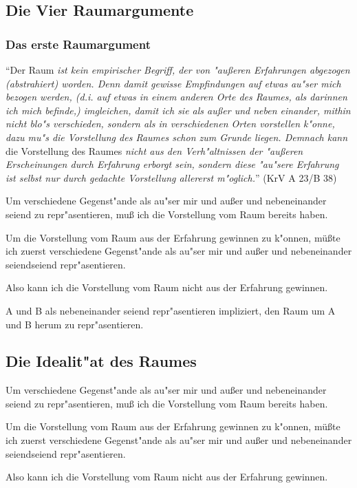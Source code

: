 \documentclass[emulatestandardclasses]{scrartcl}
\begin{document}
\subsection{Die Vier Raumargumente}

\subsubsection{Das erste Raumargument}

"`Der Raum \emph{ist kein empirischer Begriff, der von "außeren Erfahrungen abgezogen (abstrahiert) worden. Denn damit gewisse Empfindungen auf etwas au"ser mich bezogen werden, (d.i. auf etwas in einem anderen Orte des Raumes, als darinnen ich mich befinde,) imgleichen, damit ich sie als außer und neben einander, mithin nicht blo"s verschieden, sondern als in verschiedenen Orten vorstellen k"onne, dazu mu"s die Vorstellung des Raumes schon zum Grunde liegen. Demnach kann} die Vorstellung des Raumes \emph{nicht aus den Verh"altnissen der "außeren Erscheinungen durch Erfahrung erborgt sein, sondern diese "au"sere Erfahrung ist selbst nur durch gedachte Vorstellung allererst m"oglich.}"' (KrV A 23/B 38)

\begin{description}[leftmargin=!,labelwidth=\widthof{\bfseries P2}]
  \item[P1] Um verschiedene Gegenst"ande als au"ser mir und außer und nebeneinander seiend zu repr"asentieren, muß ich die Vorstellung vom Raum bereits haben.
  \item[P2] Um die Vorstellung vom Raum aus der Erfahrung gewinnen zu k"onnen, müßte ich zuerst verschiedene Gegenst"ande als au"ser mir und außer und nebeneinander seiendseiend repr"asentieren.
  \item[K] Also kann ich die Vorstellung vom Raum nicht aus der Erfahrung gewinnen.
\end{description}

A und B als nebeneinander seiend repr"asentieren impliziert, den Raum um A und B herum zu repr"asentieren.	

\subsection{Die Idealit"at des Raumes}

\begin{description}[leftmargin=!,labelwidth=\widthof{\bfseries P2}]
  \item[P1] Um verschiedene Gegenst"ande als au"ser mir und außer und nebeneinander seiend zu repr"asentieren, muß ich die Vorstellung vom Raum bereits haben.
  \item[P2] Um die Vorstellung vom Raum aus der Erfahrung gewinnen zu k"onnen, müßte ich zuerst verschiedene Gegenst"ande als au"ser mir und außer und nebeneinander seiendseiend repr"asentieren.
  \item[K] Also kann ich die Vorstellung vom Raum nicht aus der Erfahrung gewinnen.
\end{description}
\end{document}
